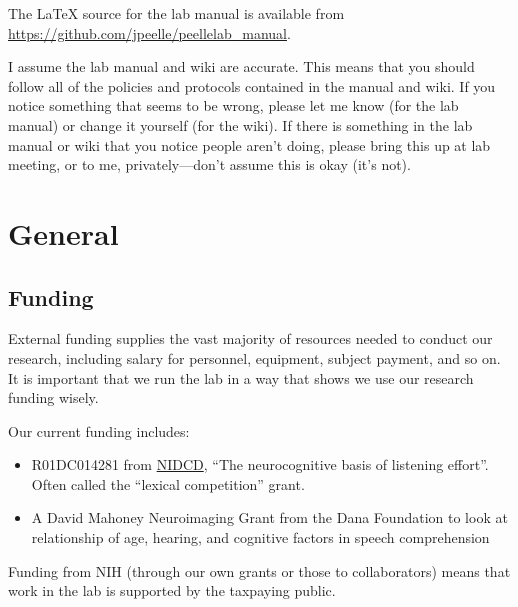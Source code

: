 \documentclass[letterpaper,12pt,oneside]{memoir}
\begin{document}
The LaTeX source for the lab manual is available from \url{https://github.com/jpeelle/peellelab_manual}.

 \begin{shaded}
\noindent I assume the lab manual and wiki are accurate. This means that you should follow all of the policies and protocols contained in the manual and wiki. If you notice something that seems to be wrong, please let me know (for the lab manual) or change it yourself (for the wiki). If there is something in the lab manual or wiki that you notice people aren't doing, please bring this up at lab meeting, or to me, privately---don't assume this is okay (it's not).
\end{shaded}


\chapter{General} %

\section{Funding}

External funding supplies the vast majority of resources needed to conduct our research, including salary for personnel, equipment, subject payment, and so on. It is important that we run the lab in a way that shows we use our research funding wisely.

Our current funding includes:

\begin{itemize}
\item{R01DC014281 from \href{http://www.nidcd.nih.gov}{NIDCD}, ``The neurocognitive basis of listening effort''. Often called the ``lexical competition'' grant.}
\item{A David Mahoney Neuroimaging Grant from the Dana Foundation to look at relationship of age, hearing, and cognitive factors in speech comprehension}
\end{itemize}

Funding from NIH (through our own grants or those to collaborators) means that work in the lab is supported by the taxpaying public.
\end{document}

